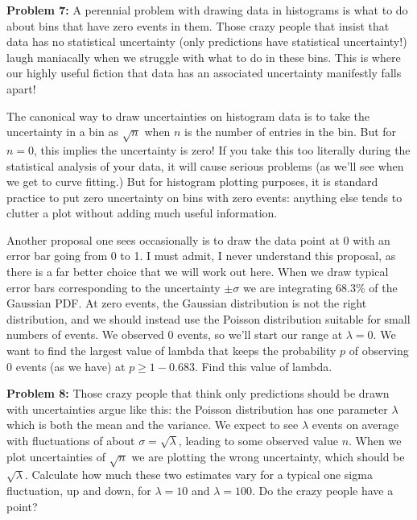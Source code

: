 \documentclass[12pt]{article}
\begin{document}
\noindent
{\bf Problem 7:}  A perennial problem with drawing data in histograms is what to do about bins that have zero events in them.  Those crazy people that insist that data has no statistical uncertainty (only predictions have statistical uncertainty!) laugh maniacally when we struggle with what to do in these bins.  This is where our highly useful fiction that data has an associated uncertainty manifestly falls apart! 

The canonical way to draw uncertainties on histogram data is to take the uncertainty in a bin as $\sqrt{n}$ when $n$ is the number of entries in the bin.  But for $n=0$, this implies the uncertainty is zero!  If you take this too literally during the statistical analysis of your data, it will cause serious problems (as we'll see when we get to curve fitting.)   But for histogram plotting purposes, it is standard practice to put zero uncertainty on bins with zero events:  anything else tends to clutter a plot without adding much useful information. 

Another proposal one sees occasionally is to draw the data point at 0 with an error bar going from 0 to 1.  I must admit, I never understand this proposal, as there is a far better choice that we will work out here.
When we draw typical error bars corresponding to the uncertainty $\pm\sigma$ we are integrating $68.3\%$ of the Gaussian PDF.  At zero events, the Gaussian distribution is not the right distribution, and we should instead use the Poisson distribution suitable for small numbers of events.  We observed 0 events, so we'll start our range at $\lambda = 0$.  We want to find the largest value of lambda that keeps the probability $p$ of observing 0 events (as we have) at  $p \geq 1-0.683$.  Find this value of lambda. \\
\vskip 0.25cm

\noindent
{\bf Problem 8:}  Those crazy people that think only predictions should be drawn with uncertainties argue like this: the Poisson distribution has one parameter $\lambda$ which is both the mean and the variance.  We expect to see $\lambda$ events on average with fluctuations of about $\sigma = \sqrt{\lambda}$, leading to some observed value $n$.  When we plot uncertainties of $\sqrt{n}$ we are plotting the wrong uncertainty, which should be $\sqrt{\lambda}$.  Calculate how much these two estimates vary for a typical one sigma fluctuation, up and down, for $\lambda=10$ and $\lambda=100$.  Do the crazy people have a point? \\ \vskip 0.25cm
\end{document}
